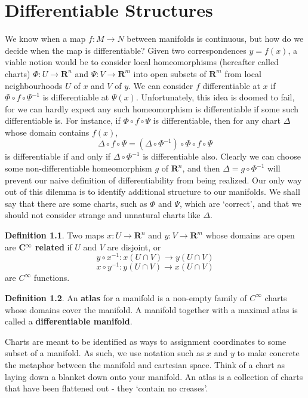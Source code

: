 \documentclass[12pt]{report}
\theoremstyle{plain}
\theoremstyle{definition}
\newtheorem*{defi}{Definition}
\newenvironment{definition}
    {\begin{samepage}\begin{framed}\begin{defi}}
    {\end{defi}\end{framed}\end{samepage}}
\begin{document}
\chapter{Differentiable Structures}

We know when a map $f:M \to N$ between manifolds is continuous, but how do we decide when the map is differentiable? Given two correspondences $y = f(x)$, a viable notion would be to consider local homeomorphisms (hereafter called charts) $\Phi:U \to \mathbf{R}^n$ and $\Psi:V \to \mathbf{R}^m$ into open subsets of $\mathbf{R}^m$ from local neighbourhoods $U$ of $x$ and $V$ of $y$. We can consider $f$ differentiable at $x$ if $\Phi \circ f \circ \Psi^{-1}$ is differentiable at $\Psi(x)$. Unfortunately, this idea is doomed to fail, for we can hardly expect any such homeomorphism is differentiable if some such differentiable is. For instance, if $\Phi \circ f \circ \Psi$ is differentiable, then for any chart $\Delta$ whose domain contains $f(x)$,
%
\[ \Delta \circ f \circ \Psi = (\Delta \circ \Phi^{-1}) \circ \Phi \circ f \circ \Psi \]
%
is differentiable if and only if $\Delta \circ \Phi^{-1}$ is differentiable also. Clearly we can choose some non-differentiable homeomorphism $g$ of $\mathbf{R}^n$, and then $\Delta = g \circ \Phi^{-1}$ will prevent our naive definition of differentiability from being realized. Our only way out of this dilemma is to identify additional structure to our manifolds. We shall say that there are some charts, such as $\Phi$ and $\Psi$, which are `correct', and that we should not consider strange and unnatural charts like $\Delta$.

\begin{definition}
    Two maps $x:U \to \mathbf{R}^n$ and $y:V \to \mathbf{R}^m$ whose domains are open are {\bf C$^\infty$ related} if $U$ and $V$ are disjoint, or
    \[ y \circ x^{-1} : x(U \cap V) \to y(U \cap V) \]
    \[ x \circ y^{-1} : y(U \cap V) \to x(U \cap V) \]
    are $C^\infty$ functions.
\end{definition}

\begin{definition}
    An {\bf atlas} for a manifold is a non-empty family of $C^\infty$ charts whose domains cover the manifold. A manifold together with a maximal atlas is called a {\bf differentiable manifold}.
\end{definition}

Charts are meant to be identified as ways to assignment coordinates to some subset of a manifold. As such, we use notation such as $x$ and $y$ to make concrete the metaphor between the manifold and cartesian space. Think of a chart as laying down a blanket down onto your manifold. An atlas is a collection of charts that have been flattened out - they `contain no creases'.
\end{document}
